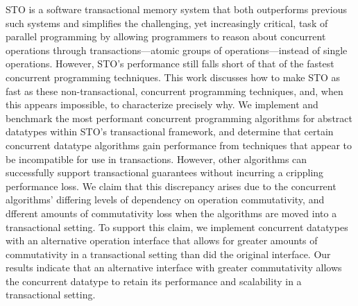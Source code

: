 STO is a software transactional memory system that both outperforms previous such systems and simplifies the challenging, yet increasingly critical, task of parallel programming by allowing programmers to reason about concurrent operations through transactions---atomic groups of operations---instead of single operations.  
However, STO's performance still falls short of that of the fastest concurrent programming techniques. This work discusses how to make STO as fast as these non-transactional, concurrent programming techniques, and, when this appears impossible, to characterize precisely why. 
We implement and benchmark the most performant concurrent programming algorithms for abstract datatypes within STO's transactional framework, and determine that certain concurrent datatype algorithms gain performance from techniques that appear to be incompatible for use in transactions.
However, other algorithms can successfully support transactional guarantees without incurring a crippling performance loss. We claim that this discrepancy arises due to the concurrent algorithms' differing levels of dependency on operation commutativity, and dfferent amounts of commutativity loss when the algorithms are moved into a transactional setting. To support this claim, we implement concurrent datatypes with an alternative operation interface that allows for greater amounts of commutativity in a transactional setting than did the original interface. Our results indicate that an alternative interface with greater commutativity allows the concurrent datatype to retain its performance and scalability in a transactional setting.
